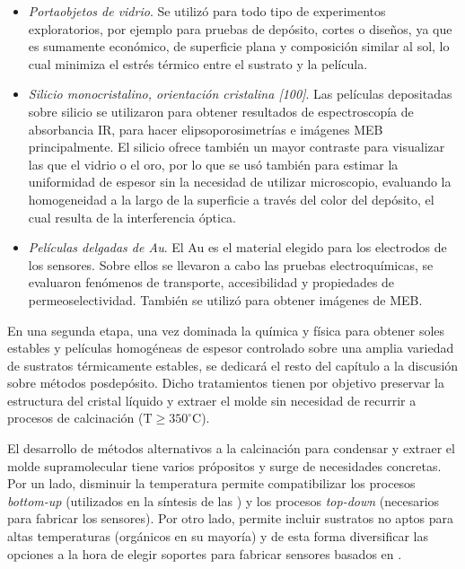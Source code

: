 		\begin{itemize}
			\item \textit{Portaobjetos de vidrio}. Se utilizó para todo tipo de experimentos exploratorios, por ejemplo para pruebas de depósito, cortes o diseños, ya que es sumamente económico, de superficie plana y composición similar al sol, lo cual minimiza el estrés térmico entre el sustrato y la película.

			\item \textit{Silicio monocristalino, orientación cristalina [100]}. Las películas depositadas sobre silicio se utilizaron para obtener resultados de espectroscopía de absorbancia IR, para hacer elipsoporosimetrías e imágenes MEB principalmente. El silicio ofrece también un mayor contraste para visualizar las \pdm\space que el vidrio o el oro, por lo que se usó también para estimar la uniformidad de espesor sin la necesidad de utilizar microscopio, evaluando la homogeneidad a la largo de la superficie a través del color del depósito, el cual resulta de la interferencia óptica.
		
			\item \textit{Películas delgadas de Au}. El Au es el material elegido para los electrodos de los sensores. Sobre ellos se llevaron a cabo las pruebas electroquímicas, se evaluaron fenómenos de transporte, accesibilidad y propiedades de permeoselectividad. También se utilizó para obtener imágenes de MEB. 
			\end{itemize}
	
	En una segunda etapa, una vez dominada la química y física para obtener soles estables y películas homogéneas de espesor controlado sobre una amplia variedad de sustratos térmicamente estables, se dedicará el resto del capítulo a la discusión sobre métodos posdepósito. Dicho tratamientos tienen por objetivo preservar la estructura del cristal líquido y extraer el molde sin necesidad de recurrir a procesos de calcinación ($\text{T} \geq 350^\circ \text{C}$).

	El desarrollo de métodos alternativos a la calcinación para condensar y extraer el molde supramolecular tiene varios própositos y surge de necesidades concretas. Por un lado, disminuir la temperatura permite compatibilizar los procesos \textit{bottom-up} (utilizados en la síntesis de las \pdm) y los procesos \textit{top-down} (necesarios para fabricar los sensores). Por otro lado, permite incluir sustratos no aptos para altas temperaturas (orgánicos en su mayoría) y de esta forma diversificar las opciones a la hora de elegir soportes para fabricar sensores basados en \pdm.\cite{Doshi2000a,Wagner2013,Innocenzi2013,Soler-Illia2002a,Zhang2005}

